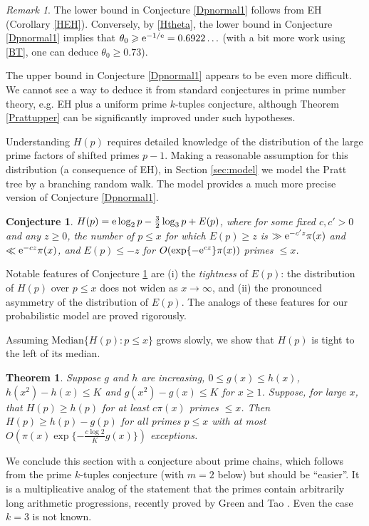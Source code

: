 \documentclass[12pt]{amsart}
\theoremstyle{remark}
\newtheorem{remark}{Remark}
\theoremstyle{plain}
\newtheorem{conj}{Conjecture}
\newtheorem{thm}{Theorem}
\numberwithin{equation}{section}
\renewcommand{\th}{\ensuremath{\theta}}
\renewcommand{\(}{\left(}
\renewcommand{\)}{\right)}
\newcommand{\er}{{\rm e}}  %
\renewcommand{\le}{\leqslant}
\renewcommand{\ge}{\geqslant}
\begin{document}
\begin{remark}
The lower bound in Conjecture \ref{Dpnormal1} follows from EH (Corollary \ref{HEH}).
Conversely, by \eqref{Htheta}, the lower bound in Conjecture \ref{Dpnormal1}
implies that $\th_0 \ge \er^{-1/\er}=0.6922\ldots$ (with a bit more work
using \eqref{BT}, one can deduce $\th_0\ge 0.73$).  

The upper bound in Conjecture  \ref{Dpnormal1} appears to 
be even more difficult.
We cannot see a way to deduce it from standard conjectures in prime
number theory, e.g. EH plus a uniform prime $k$-tuples conjecture,
although Theorem \ref{Prattupper} can be significantly improved under such hypotheses.
\end{remark}

Understanding $H(p)$ requires detailed knowledge of the distribution
of the large prime factors of shifted primes $p-1$.  Making a reasonable
assumption for this distribution (a consequence of EH),
in Section \ref{sec:model} we model the Pratt tree by a branching random walk.
The model provides a much more precise version of Conjecture \ref{Dpnormal1}.

\begin{conj}\label{Dpnormal2}
$H(p)=\er \log_2 p - \frac32 \log_3 p+E(p)$, where
for  some fixed $c,c'>0$ and  any $z\ge 0$, the number of 
$p\le x$ for which $E(p) \ge z$ is $\gg \er^{-c'z}\pi(x)$ and
$\ll \er^{-cz} \pi(x)$, and $E(p)\le -z$
for $O(\exp\{ - \er^{cz} \} \pi(x))$ primes $\le x$.
\end{conj}

Notable features of Conjecture
\ref{Dpnormal2} are (i) the \emph{tightness} of $E(p)$: the distribution
of $H(p)$ over $p\le x$ does not widen as $x\to\infty$, and (ii) the
pronounced asymmetry of the distribution of $E(p)$.  The analogs of
these features for our probabilistic model are proved rigorously.

Assuming $\text{Median}\{H(p): p\le x\}$ grows slowly, we show that $H(p)$ is tight
to the left of its median.

\begin{thm}\label{tightleft}
Suppose $g$ and $h$ are increasing, $0\le
g(x)\le h(x)$, $h(x^2)-h(x)\le K$ and $g(x^2)-g(x)\le
K$ for $x\ge 1$.  Suppose, for large $x$, that $H(p)\ge h(p)$ for at least
$c\pi(x)$ primes $\le x$.  Then $H(p) \ge h(p) - g(p)$
for all primes $p\le x$ with at most $O(\pi(x) \exp \{ - \frac{c\log
  2}{K} g(x) \})$ exceptions. 
\end{thm} 

We conclude this section with a conjecture about prime chains, which
follows from the prime $k$-tuples conjecture (with $m=2$ below)
but should be ``easier''.
It is a multiplicative analog of the statement that the
primes contain arbitrarily long arithmetic progressions, recently
proved by Green and Tao \cite{GT}.
Even the case $k=3$ is not known.
\end{document}
